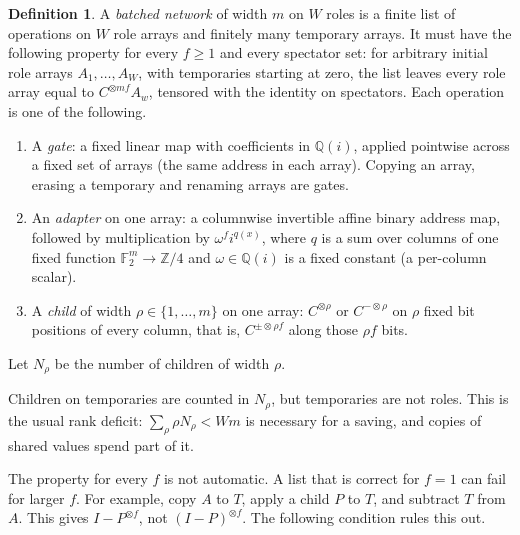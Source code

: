 \documentclass[11pt]{article}
\theoremstyle{definition}
\newtheorem{definition}[theorem]{Definition}
\newcommand{\F}{\mathbb F}
\begin{document}
\begin{definition}\label{def:network}
A \emph{batched network} of width $m$ on $W$ roles is a finite list of
operations on $W$ role arrays and finitely many temporary arrays. It must have
the following property for every $f\ge1$ and every spectator set: for arbitrary
initial role arrays $A_1,\dots,A_W$, with temporaries starting at zero, the list
leaves every role array equal to $C^{\otimes mf}A_w$, tensored with the
identity on spectators. Each operation is one of the following.
\begin{enumerate}
\item A \emph{gate}: a fixed linear map with coefficients in
  $\mathbb Q(i)$, applied pointwise across a fixed set of arrays (the same
  address in each array). Copying an array, erasing a temporary and renaming
  arrays are gates.
\item An \emph{adapter} on one array: a columnwise invertible affine binary
  address map, followed by multiplication by $\omega^f i^{q(x)}$, where $q$ is a
  sum over columns of one fixed function $\F_2^m\to\mathbb Z/4$ and
  $\omega\in\mathbb Q(i)$ is a fixed constant (a per-column scalar).
\item A \emph{child} of width $\rho\in\{1,\dots,m\}$ on one array: $C^{\otimes\rho}$
  or $C^{-\otimes\rho}$ on $\rho$ fixed bit positions of every column, that is,
  $C^{\pm\otimes\rho f}$ along those $\rho f$ bits.
\end{enumerate}
Let $N_\rho$ be the number of children of width $\rho$.
\end{definition}

Children on temporaries are counted in $N_\rho$, but temporaries are not roles.
This is the usual rank deficit: $\sum_\rho\rho N_\rho<Wm$ is necessary for a
saving, and copies of shared values spend part of it.

The property for every $f$ is not automatic. A list that is correct for $f=1$
can fail for larger $f$. For example, copy $A$ to $T$, apply a child $P$ to $T$,
and subtract $T$ from $A$. This gives $I-P^{\otimes f}$, not $(I-P)^{\otimes f}$.
The following condition rules this out.
\end{document}
